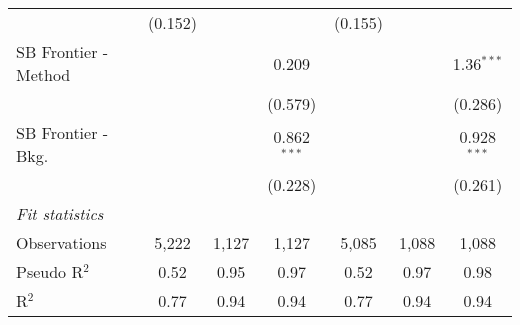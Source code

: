 \begin{tabular}{lcccccc}
                                & (0.152)        &               &               & (0.155)        &               &   \\   
   SB Frontier - Method         &                &               & 0.209         &                &               & 1.36$^{***}$\\   
                                &                &               & (0.579)       &                &               & (0.286)\\   
   SB Frontier - Bkg.           &                &               & 0.862$^{***}$ &                &               & 0.928$^{***}$\\   
                                &                &               & (0.228)       &                &               & (0.261)\\   
   \midrule
   \emph{Fit statistics}\\
   Observations                 & 5,222          & 1,127         & 1,127         & 5,085          & 1,088         & 1,088\\  
   Pseudo R$^2$                 & 0.52           & 0.95          & 0.97          & 0.52           & 0.97          & 0.98\\  
   R$^2$                        & 0.77           & 0.94          & 0.94          & 0.77           & 0.94          & 0.94\\  
   

\end{tabular}

